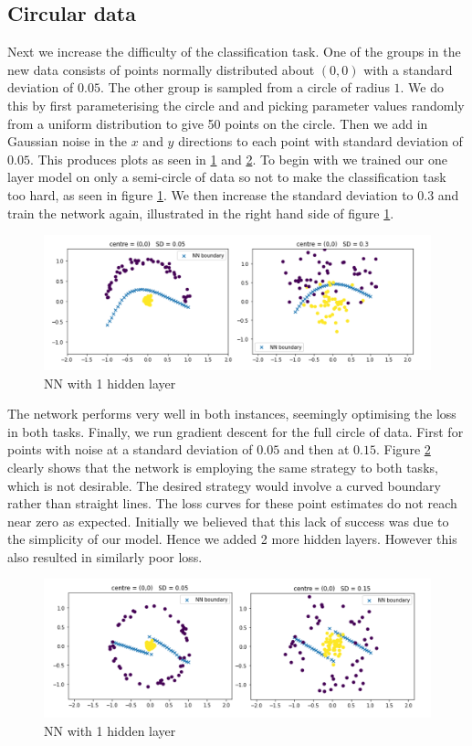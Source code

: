 \documentclass[review]{siamart190516}
\begin{document}
\subsection{Circular data}
Next we increase the difficulty of the classification task. One of the groups in the new data consists of points normally distributed about $(0,0)$ with a standard deviation of $0.05$. The other group is sampled from a circle of radius $1$. We do this by first parameterising the circle and and picking parameter values randomly from a uniform distribution to give 50 points on the circle. Then we add in Gaussian noise in the $x$ and $y$ directions to each point with standard deviation of $0.05$. This produces plots as seen in \ref{fig:2} and \ref{fig:3}.
\newline
To begin with we trained our one layer model on only a semi-circle of data so not to make the classification task too hard, as seen in figure \ref{fig:2}. We then increase the standard deviation to $0.3$ and train the network again, illustrated in the right hand side of figure \ref{fig:2}. 
\begin{figure}[h!]
    \centering
    \includegraphics[width = \textwidth]{Images/2.png}
    \caption{NN with 1 hidden layer}
    \label{fig:2}
\end{figure}
\newline
The network performs very well in both instances, seemingly optimising the loss in both tasks. 
\newline 
Finally, we run gradient descent for the full circle of data. First for points with noise at a standard deviation of $0.05$ and then at $0.15$. Figure \ref{fig:3} clearly shows that the network is employing the same strategy to both tasks, which is not desirable. The desired strategy would involve a curved boundary rather than straight lines. The loss curves for these point estimates do not reach near zero as expected. Initially we believed that this lack of success was due to the simplicity of our model. Hence we added 2 more hidden layers. However this also resulted in similarly poor loss.
\begin{figure}[h!]
    \centering
    \includegraphics[width = \textwidth]{Images/3.png}
    \caption{NN with 1 hidden layer}
    \label{fig:3}
\end{figure}
\end{document}
